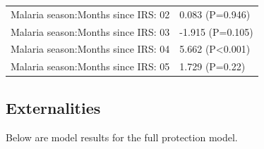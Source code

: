 \documentclass[]{article}
\begin{document}
\begin{longtable}[t]{ll}
\hspace{1em}Malaria season:Months since IRS: 02 & 0.083 (P=0.946)\\
\hspace{1em}Malaria season:Months since IRS: 03 & -1.915 (P=0.105)\\
\hspace{1em}Malaria season:Months since IRS: 04 & 5.662 (P<0.001)\\
\hspace{1em}Malaria season:Months since IRS: 05 & 1.729 (P=0.22)\\*
\end{longtable}

\subsection{Externalities}\label{externalities-1}

Below are model results for the full protection model.
\end{document}
